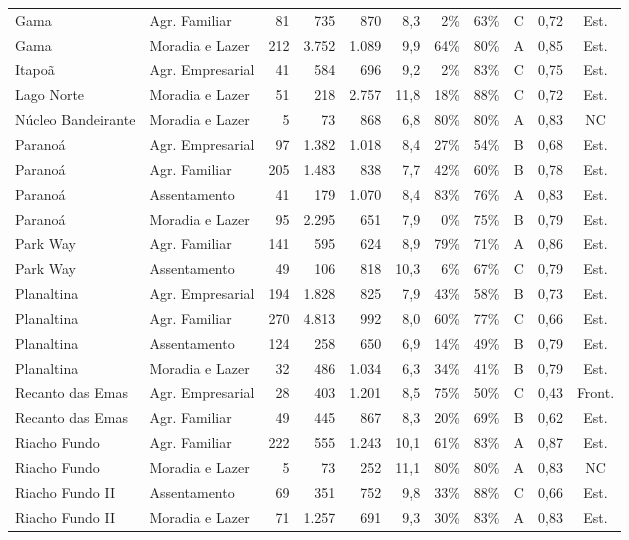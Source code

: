 {\begin{longtable}{@{}l l r r r r r r c c c@{}}
Gama & Agr. Familiar & 81 & 735 & 870 & 8,3 & 2\% & 63\% & C & 0,72 & Est. \\
Gama & Moradia e Lazer & 212 & 3.752 & 1.089 & 9,9 & 64\% & 80\% & A & 0,85 & Est. \\
Itapoã & Agr. Empresarial & 41 & 584 & 696 & 9,2 & 2\% & 83\% & C & 0,75 & Est. \\
Lago Norte & Moradia e Lazer & 51 & 218 & 2.757 & 11,8 & 18\% & 88\% & C & 0,72 & Est. \\
Núcleo Bandeirante & Moradia e Lazer & 5 & 73 & 868 & 6,8 & 80\% & 80\% & A & 0,83 & NC \\
Paranoá & Agr. Empresarial & 97 & 1.382 & 1.018 & 8,4 & 27\% & 54\% & B & 0,68 & Est. \\
Paranoá & Agr. Familiar & 205 & 1.483 & 838 & 7,7 & 42\% & 60\% & B & 0,78 & Est. \\
Paranoá & Assentamento & 41 & 179 & 1.070 & 8,4 & 83\% & 76\% & A & 0,83 & Est. \\
Paranoá & Moradia e Lazer & 95 & 2.295 & 651 & 7,9 & 0\% & 75\% & B & 0,79 & Est. \\
Park Way & Agr. Familiar & 141 & 595 & 624 & 8,9 & 79\% & 71\% & A & 0,86 & Est. \\
Park Way & Assentamento & 49 & 106 & 818 & 10,3 & 6\% & 67\% & C & 0,79 & Est. \\
Planaltina & Agr. Empresarial & 194 & 1.828 & 825 & 7,9 & 43\% & 58\% & B & 0,73 & Est. \\
Planaltina & Agr. Familiar & 270 & 4.813 & 992 & 8,0 & 60\% & 77\% & C & 0,66 & Est. \\
Planaltina & Assentamento & 124 & 258 & 650 & 6,9 & 14\% & 49\% & B & 0,79 & Est. \\
Planaltina & Moradia e Lazer & 32 & 486 & 1.034 & 6,3 & 34\% & 41\% & B & 0,79 & Est. \\
Recanto das Emas & Agr. Empresarial & 28 & 403 & 1.201 & 8,5 & 75\% & 50\% & C & 0,43 & Front. \\
Recanto das Emas & Agr. Familiar & 49 & 445 & 867 & 8,3 & 20\% & 69\% & B & 0,62 & Est. \\
Riacho Fundo & Agr. Familiar & 222 & 555 & 1.243 & 10,1 & 61\% & 83\% & A & 0,87 & Est. \\
Riacho Fundo & Moradia e Lazer & 5 & 73 & 252 & 11,1 & 80\% & 80\% & A & 0,83 & NC \\
Riacho Fundo II & Assentamento & 69 & 351 & 752 & 9,8 & 33\% & 88\% & C & 0,66 & Est. \\
Riacho Fundo II & Moradia e Lazer & 71 & 1.257 & 691 & 9,3 & 30\% & 83\% & A & 0,83 & Est. \\

\end{longtable}}
